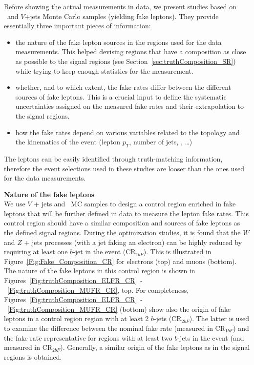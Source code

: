 Before showing the actual measurements in data, we present studies based on \ttbar\ and $V$+jets Monte Carlo samples (yielding fake leptons). They provide essentially three important pieces of information: 
\begin{itemize}
\item the nature of the fake lepton sources in the regions used for the data measurements. 
This helped devising regions that have a composition as close as possible to the signal regions (see Section~\ref{sec:truthComposition_SR}) while trying to keep enough statistics for the measurement. 
\item whether, and to which extent, the fake rates differ between the different sources of fake leptons. 
This is a crucial input to define the systematic uncertainties assigned on the measured fake rates and their extrapolation to the signal regions. 
\item how the fake rates depend on various variables related to the topology and the kinematics of the event (lepton $p_T$, number of jets, \met, \meff\ldots)
\end{itemize}
The leptons can be easily identified through truth-matching information, 
therefore the event selections used in these studies are looser than the ones used for the data measurements. 


\par{\bf Nature of the fake leptons\\}
We use $V$ + jets and \ttbar\ MC samples to design a control region enriched in fake leptons that will be further defined in data to measure the lepton fake rates. 
This control region should have a similar composition and sources of fake leptons as the defined signal regions. 
During the optimization studies, it is found that the $W$ and $Z$ + jets processes (with a jet faking an electron) 
can be highly reduced by requiring at least one $b$-jet in the event (CR$_{1bF}$). 
This is illustrated in Figure~\ref{Fig:Fake_Composition_CR} for electrons (top) and muons (bottom). 
The nature of the fake leptons in this control region is shown in Figures~\ref{Fig:truthComposition_ELFR_CR}~-~\ref{Fig:truthComposition_MUFR_CR}, top. 
For completeness, Figures~\ref{Fig:truthComposition_ELFR_CR}~-~\ref{Fig:truthComposition_MUFR_CR} (bottom) 
show also the origin of fake leptons in a control region region with at least 2 $b$-jets (CR$_{2bF}$). 
The latter is used to examine the difference between the nominal fake rate (measured in CR$_{1bF}$) 
and the fake rate representative for regions with at least two $b$-jets in the event (and measured in CR$_{2bF}$). 
Generally, a similar origin of the fake leptons as in the signal regions is obtained. 

